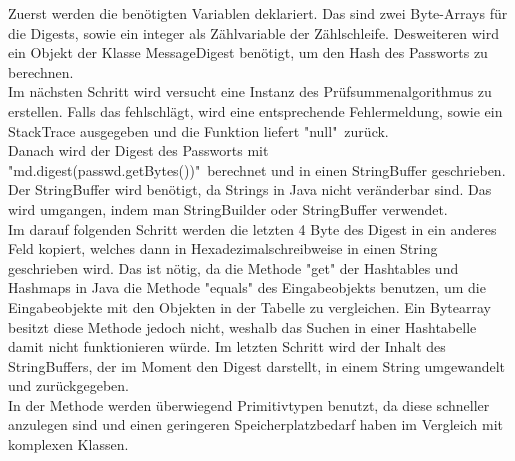 \documentclass[11pt]{article}
\begin{document}
Zuerst werden die benötigten Variablen deklariert. Das sind zwei Byte-Arrays für die Digests, sowie ein integer als Zählvariable der Zählschleife. Desweiteren wird ein Objekt der Klasse MessageDigest benötigt, um den Hash des Passworts zu berechnen. \\
Im nächsten Schritt wird versucht eine Instanz des Prüfsummenalgorithmus zu erstellen. Falls das fehlschlägt, wird eine entsprechende Fehlermeldung, sowie ein StackTrace ausgegeben und die Funktion liefert "null"\ zurück.\\
Danach wird der Digest des Passworts mit "md.digest(passwd.getBytes())"\ berechnet und in einen StringBuffer geschrieben. Der StringBuffer wird benötigt, da Strings in Java nicht veränderbar sind. Das wird umgangen, indem man StringBuilder oder StringBuffer verwendet. \\
Im darauf folgenden Schritt werden die letzten 4 Byte des Digest in ein anderes Feld kopiert, welches dann in Hexadezimalschreibweise in einen String geschrieben wird. Das ist nötig, da die Methode "get" der Hashtables und Hashmaps in Java die Methode "equals" des Eingabeobjekts benutzen, um die Eingabeobjekte mit den Objekten in der Tabelle zu vergleichen. Ein Bytearray besitzt diese Methode jedoch nicht, weshalb das Suchen in einer Hashtabelle damit nicht funktionieren würde.
Im letzten Schritt wird der Inhalt des StringBuffers, der im Moment den Digest darstellt, in einem String umgewandelt und zurückgegeben.\\
In der Methode werden überwiegend Primitivtypen benutzt, da diese schneller anzulegen sind und einen geringeren Speicherplatzbedarf haben im Vergleich mit komplexen Klassen.
\end{document}
